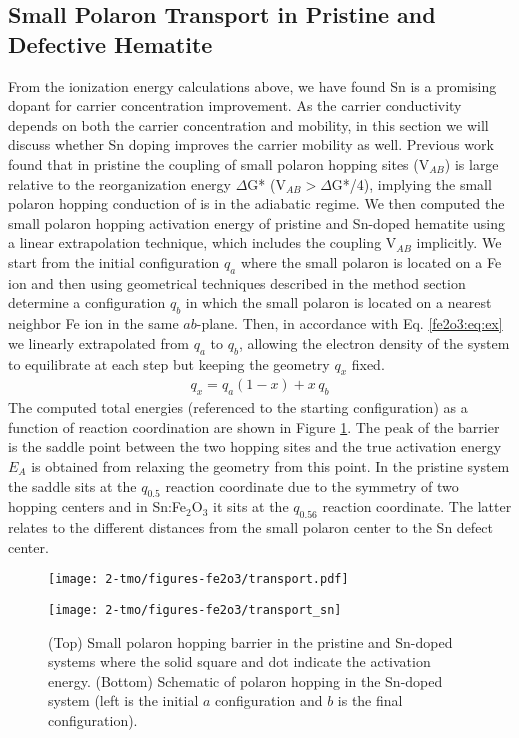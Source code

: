 \subsection{Small Polaron Transport in Pristine and Defective Hematite}

From the ionization energy calculations above, we have found Sn is a promising dopant for carrier concentration improvement. As the carrier conductivity depends on both the carrier concentration and mobility, in this section we will discuss whether Sn doping improves the carrier mobility as well. Previous work \cite{rosso2003an} found that in pristine  the coupling of small polaron hopping sites (V$_{AB}$) is large relative to the reorganization energy $\Delta$G* (V$_{AB} > \Delta$G*/4), implying the small polaron hopping conduction of  is in the adiabatic regime. We then computed the small polaron hopping activation energy of pristine and Sn-doped hematite using a linear extrapolation technique, which includes the coupling V$_{AB}$ implicitly. We start from the initial configuration $q_{a}$ where the small polaron is located on a Fe ion and then using geometrical techniques described in the method section determine a configuration $q_{b}$ in which the small polaron is located on a nearest neighbor Fe ion in the same $ab$-plane. Then, in accordance with Eq. \ref{fe2o3:eq:ex} we linearly extrapolated from $q_{a}$ to $q_{b}$, allowing the electron density of the system to equilibrate at each step but keeping the geometry $q_{x}$ fixed.
\begin{align}
q_{x} = q_{a}(1-x)+x\,q_b \label{fe2o3:eq:ex}
\end{align}
The computed total energies (referenced to the starting configuration) as a function of reaction coordination are shown in Figure \ref{fe2o3:fig:transport}. The peak of the barrier is the saddle point between the two hopping sites and the true activation energy $E_{A}$ is obtained from relaxing the geometry from this point. In the pristine system the saddle sits at the $q_{0.5}$ reaction coordinate due to the symmetry of two hopping centers and in Sn:Fe$_2$O$_3$ it sits at the $q_{0.56}$ reaction coordinate. The latter relates to the different distances from the small polaron center to  the Sn defect center.\\


\begin{figure}[t!]
\begin{center}
\texttt{[image: 2-tmo/figures-fe2o3/transport.pdf]}

\vspace{2mm}

\texttt{[image: 2-tmo/figures-fe2o3/transport\_sn]}
\end{center}
\caption{(Top) Small polaron hopping barrier in the pristine and Sn-doped systems where the solid square and dot indicate the activation energy. (Bottom) Schematic of polaron hopping in the Sn-doped system (left is the initial $a$ configuration and $b$ is the final configuration).} \label{fe2o3:fig:transport}
\end{figure}

